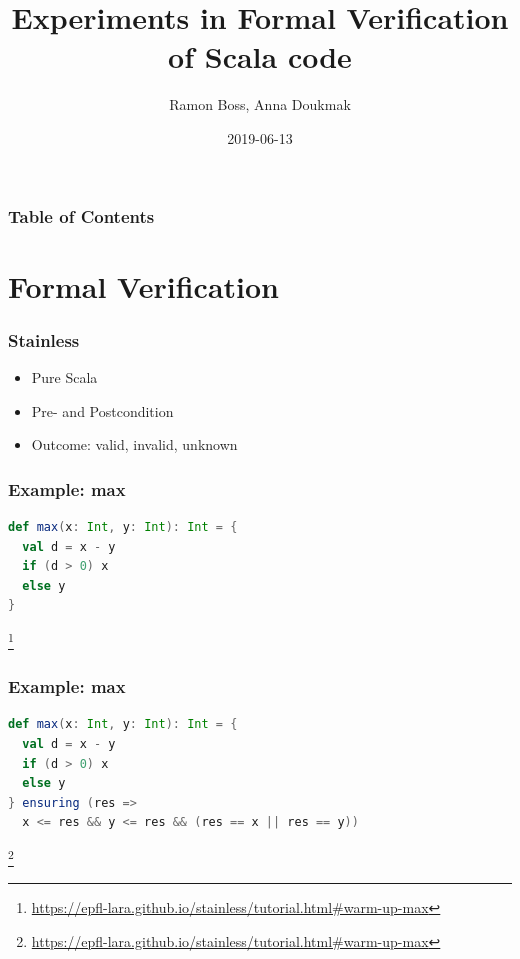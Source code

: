 \documentclass{beamer}
\newcommand\blfootnote[1]{%
  \begingroup
  \renewcommand\thefootnote{}\footnote{#1}%
  \addtocounter{footnote}{-1}%
  \endgroup
}
\begin{document}
\title{Experiments in Formal Verification of Scala code}
\author{Ramon Boss, Anna Doukmak}

\date{2019-06-13}

\frame{\titlepage}


\begin{frame}
  \frametitle{Table of Contents}
  \tableofcontents
\end{frame}


\section{Formal Verification}


\begin{frame}
\frametitle{Stainless}
\begin{itemize}
  \item Pure Scala
  \item Pre- and Postcondition
  \item Outcome: valid, invalid, unknown
\end{itemize}
\end{frame}


\begin{frame}[fragile]
\frametitle{Example: max}
\begin{lstlisting}[language=Scala]
def max(x: Int, y: Int): Int = {
  val d = x - y
  if (d > 0) x
  else y
}
\end{lstlisting}
\blfootnote{\url{https://epfl-lara.github.io/stainless/tutorial.html\#warm-up-max}}
\end{frame}


\begin{frame}[fragile]
\frametitle{Example: max}
\begin{lstlisting}[language=Scala]
def max(x: Int, y: Int): Int = {
  val d = x - y
  if (d > 0) x
  else y
} ensuring (res =>
  x <= res && y <= res && (res == x || res == y))
\end{lstlisting}
\blfootnote{\url{https://epfl-lara.github.io/stainless/tutorial.html\#warm-up-max}}
\end{frame}
\end{document}
